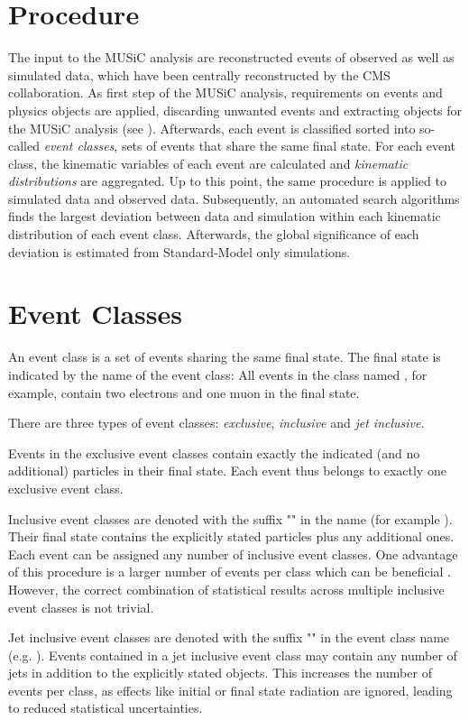 \section{Procedure}
The input to the \ac{MUSiC} analysis are reconstructed events of observed as well as simulated data, which have been centrally reconstructed by the \ac{CMS} collaboration.
As first step of the \ac{MUSiC} analysis, requirements on events and physics objects are applied, discarding unwanted events and extracting objects for the \ac{MUSiC} analysis (see ).
Afterwards, each event is classified sorted into so-called \emph{event classes}, sets of events that share the same final state.
For each event class, the kinematic variables of each event are calculated and \emph{kinematic distributions} are aggregated.
Up to this point, the same procedure is applied to simulated data and observed data.
Subsequently, an automated search algorithms finds the largest deviation between data and simulation within each kinematic distribution of each event class. Afterwards, the global significance of each deviation is estimated from Standard-Model only simulations.

\section{Event Classes}
An event class is a set of events sharing the same final state. The final state is indicated by the name of the event class: All events in the class named \eventclass{2\Pe + 1\Pmu}, for example, contain two electrons and one muon in the final state.

There are three types of event classes: \emph{exclusive}, \emph{inclusive} and \emph{jet inclusive}.

Events in the exclusive event classes contain exactly the indicated (and no additional) particles in their final state. Each event thus belongs to exactly one exclusive event class.

Inclusive event classes are denoted with the suffix "" in the name (for example ). Their final state contains the explicitly stated particles plus any additional ones. Each event can be assigned any number of inclusive event classes. One advantage of this procedure is a larger number of events per class which can be beneficial . However, the correct combination of statistical results across multiple inclusive event classes is not trivial.

Jet inclusive event classes are denoted with the suffix "" in the event class name (e.g. ). Events contained in a jet inclusive event class may contain any number of jets in addition to the explicitly stated objects. This increases the number of events per class, as effects like initial or final state radiation are ignored, leading to reduced statistical uncertainties.

